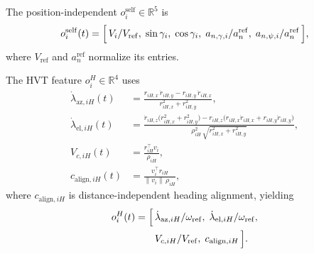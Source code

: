 \documentclass{cja}
\begin{document}
The position-independent $o_i^{\mathrm{self}}\in\mathbb{R}^{5}$ is
\begin{equation}
o_i^{\mathrm{self}}(t)=\Bigl[\,V_i/V_{\mathrm{ref}},\;\sin\gamma_i,\;\cos\gamma_i,\;a_{n,\gamma,i}/a^{\mathrm{ref}}_n,\;a_{n,\psi,i}/a^{\mathrm{ref}}_n\,\Bigr],
\label{eq:obs-self}
\end{equation}
where $V_{\mathrm{ref}}$ and $a^{\mathrm{ref}}_n$ normalize its entries.

The HVT feature $o_i^{H}\in\mathbb{R}^{4}$ uses
\begin{align}
\dot\lambda_{\mathrm{az},iH}(t)&=\frac{r_{iH,x}\,\dot r_{iH,y}-r_{iH,y}\,\dot r_{iH,x}}{r_{iH,x}^{2}+r_{iH,y}^{2}},
\label{eq:los-az}\\
\dot\lambda_{\mathrm{el},iH}(t)&=\frac{\dot r_{iH,z}\bigl(r_{iH,x}^{2}+r_{iH,y}^{2}\bigr)
-r_{iH,z}\bigl(r_{iH,x}\dot r_{iH,x}+r_{iH,y}\dot r_{iH,y}\bigr)}{\rho_{iH}^{2}\,\sqrt{r_{iH,x}^{2}+r_{iH,y}^{2}}},
\label{eq:los-el}\\
V_{c,iH}(t)&=\frac{r_{iH}^{\top}v_i}{\rho_{iH}},
\label{eq:vc-h}\\
c_{\mathrm{align},iH}(t)&=\frac{v_i^{\top}r_{iH}}{\|v_i\|\,\rho_{iH}},
\label{eq:cos-align}
\end{align}
where $c_{\mathrm{align},iH}$ is distance-independent heading alignment, yielding
\begin{equation}
\begin{aligned}
o_i^{H}(t)=\Bigl[\,&\dot\lambda_{\mathrm{az},iH}/\omega_{\mathrm{ref}},\;
\dot\lambda_{\mathrm{el},iH}/\omega_{\mathrm{ref}},\\
&V_{c,iH}/V_{\mathrm{ref}},\;c_{\mathrm{align},iH}\,\Bigr].
\end{aligned}
\end{equation}
\end{document}
